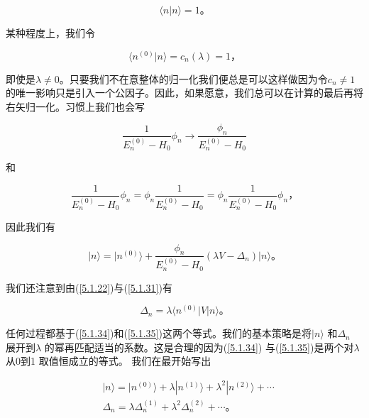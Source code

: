 ﻿\documentclass[UTF8,twoside]{ctexart}
\begin{document}
\begin{equation} \label{5.1.30}
\langle n|n\rangle = 1\text{。}
\end{equation}

\noindent 某种程度上，我们令

\begin{equation} \label{5.1.31}
\langle n^{(0)}|n\rangle = c_n(\lambda) = 1\text{，}
\end{equation}

\noindent 即使是$\lambda \neq 0$。只要我们不在意整体的归一化我们便总是可以这样做因为令$c_n\neq 1$ 的唯一影响只是引入一个公因子。因此，如果愿意，我们总可以在计算的最后再将右矢归一化。习惯上我们也会写

\begin{equation} \label{5.1.32}
\dfrac{1}{E_n^{(0)}-H_0}\phi_n \rightarrow \dfrac{\phi_n}{E_n^{(0)}-H_0}
\end{equation}

\noindent 和

\begin{equation} \label{5.1.33}
\dfrac{1}{E_n^{(0)}-H_0}\phi_n = \phi_n\dfrac{1}{E_n^{(0)}-H_0} = \phi_n\dfrac{1}{E_n^{(0)}-H_0}\phi_n\text{，}
\end{equation}

\noindent 因此我们有

\begin{equation} \label{5.1.34}
|n\rangle=|n^{(0)}\rangle + \dfrac{\phi_n}{E_n^{(0)}-H_0}(\lambda V-\Delta_n)|n\rangle\text{。}
\end{equation}

\noindent 我们还注意到由(\ref{5.1.22})与(\ref{5.1.31})有

\begin{equation} \label{5.1.35}
\Delta_n = \lambda \langle n^{(0)}|V|n\rangle\text{。}
\end{equation}

任何过程都基于(\ref{5.1.34})和(\ref{5.1.35})这两个等式。我们的基本策略是将$|n\rangle$ 和$\Delta_n$ 展开到$\lambda$ 的幂再匹配适当的系数。这是合理的因为(\ref{5.1.34}) 与(\ref{5.1.35})是两个对$\lambda$从0到1 取值恒成立的等式。 我们在最开始写出

\begin{equation} \label{5.1.36}
\begin{split}
&|n\rangle = |n^{(0)}\rangle + \lambda|n^{(1)}\rangle + \lambda^2|n^{(2)}\rangle + \cdots \\
&\Delta_n = \lambda\Delta_n^{(1)} + \lambda^2\Delta_n^{(2)} + \cdots\text{。}
\end{split}
\end{equation}
\end{document}
